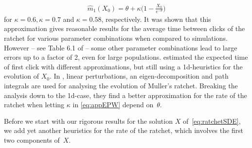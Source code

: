 \documentclass{imsart}
\theoremstyle{plain}
\theoremstyle{definition}
\begin{document}
\begin{align}
  \label{eq:appEPW}
  \widehat m_1(X_0) = \theta + \kappa\Big(1 - \frac{X_0}{e^{-\theta}}\Big)
\end{align}
for $\kappa=0.6, \kappa=0.7$ and $\kappa=0.58$, respectively.
It was shown that this approximation gives reasonable results for the average time between clicks of the ratchet for various parameter combinations when compared to simulations. However -- see Table 6.1 of \cite{StephanKim2002} -- some other parameter combinations lead to large errors up to a factor of 2, even for large populations. \cite{assaf2011fixation, metzger2013distribution, brautigam2022diffusion} estimated the expected time of first click with different approximations, but still using a 1d-heuristics for the evolution of $X_0$. 
In \cite{neher2012fluctuations}, linear perturbations, an eigen-decomposition and path integrals are used for analysing the evolution of Muller’s ratchet. Breaking the analysis down to the 1d-case, they find a better approximation for the rate of the ratchet when letting $\kappa$ in 
\eqref{eq:appEPW} depend on~$\theta$. 

Before we start with our rigorous results for the solution $X$ of~\eqref{eq:ratchetSDE}, we add yet another heuristics for the rate of the ratchet, which involves the first two components of~$X$.
\end{document}
